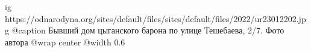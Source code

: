  
 
 
 
 

\ifcmt
  ig https://odnarodyna.org/sites/default/files/sites/default/files/2022/ur23012202.jpg
  @caption Бывший дом цыганского барона по улице Тешебаева, 2/7. Фото автора
	@wrap center
	@width 0.6
\fi
